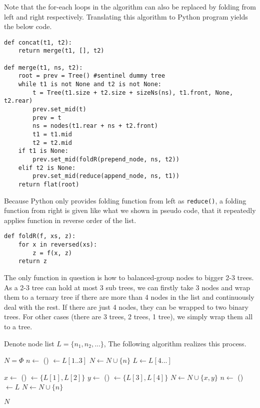 \documentclass[UTF8]{article}
\begin{document}
Note that the for-each loops in the algorithm can also be replaced by folding from left
and right respectively. Translating this algorithm to Python program yields the below code.

\lstset{language=Python}
\begin{lstlisting}
def concat(t1, t2):
    return merge(t1, [], t2)

def merge(t1, ns, t2):
    root = prev = Tree() #sentinel dummy tree
    while t1 is not None and t2 is not None:
        t = Tree(t1.size + t2.size + sizeNs(ns), t1.front, None, t2.rear)
        prev.set_mid(t)
        prev = t
        ns = nodes(t1.rear + ns + t2.front)
        t1 = t1.mid
        t2 = t2.mid
    if t1 is None:
        prev.set_mid(foldR(prepend_node, ns, t2))
    elif t2 is None:
        prev.set_mid(reduce(append_node, ns, t1))
    return flat(root)
\end{lstlisting}

Because Python only provides folding function from left as \verb|reduce()|, a folding function
from right is given like what we shown in pseudo code, that it repeatedly applies function
in reverse order of the list.

\begin{lstlisting}
def foldR(f, xs, z):
    for x in reversed(xs):
        z = f(x, z)
    return z
\end{lstlisting}

The only function in question is how to balanced-group nodes to bigger 2-3 trees. As a 2-3 tree
can hold at most 3 sub trees, we can firstly take 3 nodes and wrap them to a ternary tree if there
are more than 4 nodes in the list and continuously deal with the rest.
If there are just 4 nodes, they can be wrapped to two
binary trees. For other cases (there are 3 trees, 2 trees, 1 tree), we simply wrap them
all to a tree.

Denote node list $L=\{ n_1, n_2, ... \}$, The following algorithm realizes this process.

\begin{algorithmic}
  \State $N = \Phi$
    \State $n \gets$ ()
    \State {} $\gets L[1..3]$  
    \State $N \gets N \cup \{ n \}$
    \State $L \gets L[4...]$ 
  \EndWhile

    \State $x \gets$ ()
    \State {} $\gets \{L[1], L[2]\}$
    \State $y \gets$ ()
    \State {} $\gets \{L[3], L[4]\}$
    \State $N \gets N \cup \{ x, y \}$
    \State $n \gets$ ()
    \State {} $\gets L$
    \State $N \gets N \cup \{ n \}$
  \EndIf

  \State \Return $N$
\EndFunction
\end{algorithmic}
\end{document}
